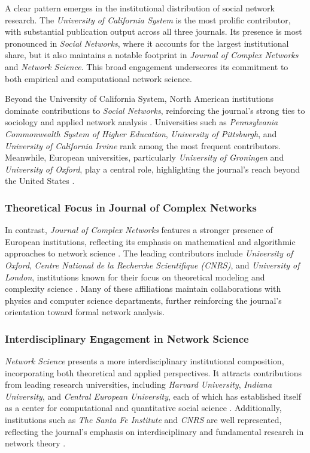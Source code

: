\documentclass[twocolumn]{article}
\begin{document}
	A clear pattern emerges in the institutional distribution of social network research. The \textit{University of California System} is the most prolific contributor, with substantial publication output across all three journals. Its presence is most pronounced in \textit{Social Networks}, where it accounts for the largest institutional share, but it also maintains a notable footprint in \textit{Journal of Complex Networks} and \textit{Network Science}. This broad engagement underscores its commitment to both empirical and computational network science.
	
	Beyond the University of California System, North American institutions dominate contributions to \textit{Social Networks}, reinforcing the journal’s strong ties to sociology and applied network analysis \cite{Moody2004, Freeman2004}. Universities such as \textit{Pennsylvania Commonwealth System of Higher Education}, \textit{University of Pittsburgh}, and \textit{University of California Irvine} rank among the most frequent contributors. Meanwhile, European universities, particularly \textit{University of Groningen} and \textit{University of Oxford}, play a central role, highlighting the journal’s reach beyond the United States \cite{Borgatti2009}.
	
	\subsubsection*{Theoretical Focus in Journal of Complex Networks}
	
	In contrast, \textit{Journal of Complex Networks} features a stronger presence of European institutions, reflecting its emphasis on mathematical and algorithmic approaches to network science \cite{Newman2010}. The leading contributors include \textit{University of Oxford}, \textit{Centre National de la Recherche Scientifique (CNRS)}, and \textit{University of London}, institutions known for their focus on theoretical modeling and complexity science \cite{Barabasi2016}. Many of these affiliations maintain collaborations with physics and computer science departments, further reinforcing the journal’s orientation toward formal network analysis.
	
	\subsubsection*{Interdisciplinary Engagement in Network Science}
	
	\textit{Network Science} presents a more interdisciplinary institutional composition, incorporating both theoretical and applied perspectives. It attracts contributions from leading research universities, including \textit{Harvard University}, \textit{Indiana University}, and \textit{Central European University}, each of which has established itself as a center for computational and quantitative social science \cite{Fortunato2018}. Additionally, institutions such as \textit{The Santa Fe Institute} and \textit{CNRS} are well represented, reflecting the journal’s emphasis on interdisciplinary and fundamental research in network theory \cite{Boccaletti2014}.
	
\end{document}
